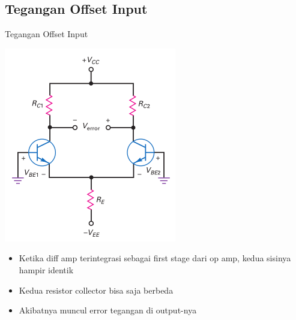 \documentclass[aspectratio=169]{beamer}
\begin{document}
\subsection{Tegangan Offset Input}
\begin{frame}{Tegangan Offset Input}
	\begin{multicols}{2}
		\begin{center}
			\includegraphics[height=0.7\textheight]{gambar/01.different_collector_resistors_produce_error_when_bases_are_grounded}
		\end{center}
		\columnbreak
		\begin{itemize}
			\item Ketika diff amp terintegrasi sebagai first stage dari op amp, kedua sisinya hampir identik
			\item Kedua resistor collector bisa saja berbeda
			\item Akibatnya muncul error tegangan di output-nya
		\end{itemize}
	\end{multicols}
\end{frame}
\end{document}
